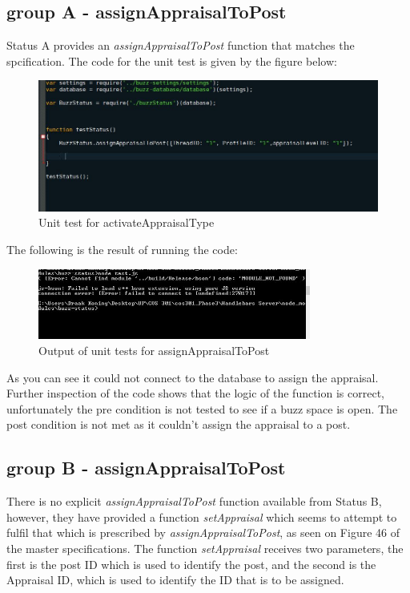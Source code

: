\documentclass[a4paper,12pt]{article}
\begin{document}
\subsection{group A - assignAppraisalToPost}

Status A provides an \textit{assignAppraisalToPost} function that matches the spcification. The code for the unit test is given by the figure below:


	\begin{figure}[H]
		\centering
		\includegraphics[width=1.0\textwidth]{Figures/aatptestCode.JPG}
		\caption{Unit test for activateAppraisalType}
	\end{figure}

The following is the result of running the code:

	\begin{figure}[H]
		\centering
		\includegraphics[width=0.8\textwidth]{Figures/aatpResult.JPG}
		\caption{Output of unit tests for assignAppraisalToPost}
	\end{figure}

As you can see it could not connect to the database to assign the appraisal. Further inspection of the code shows that the logic of the function is correct, unfortunately the pre condition is not tested to see if a buzz space is open. The post condition is not met as it couldn't assign the appraisal to a post.

\subsection{group B - assignAppraisalToPost}
There is no explicit \textit{assignAppraisalToPost} function available from Status B, however, they have provided a function \textit{setAppraisal} which seems to attempt to fulfil that which is prescribed by \textit{assignAppraisalToPost}, as seen on Figure 46 of the master specifications.
The function \textit{setAppraisal} receives two parameters, the first is the post ID which is used to identify the post, and the second is the Appraisal ID, which is used to identify the ID that is to be assigned.
\end{document}
